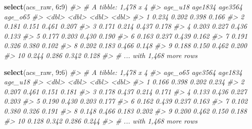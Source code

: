 \documentclass[
]{book}
\newenvironment{Shaded}{\begin{snugshade}}{\end{snugshade}}
\newcommand{\CommentTok}[1]{\textcolor[rgb]{0.56,0.35,0.01}{\textit{#1}}}
\newcommand{\DecValTok}[1]{\textcolor[rgb]{0.00,0.00,0.81}{#1}}
\newcommand{\KeywordTok}[1]{\textcolor[rgb]{0.13,0.29,0.53}{\textbf{#1}}}
\newcommand{\NormalTok}[1]{#1}
\newcommand{\OperatorTok}[1]{\textcolor[rgb]{0.81,0.36,0.00}{\textbf{#1}}}
\begin{document}
\begin{Shaded}
\begin{Highlighting}[]
\KeywordTok{select}\NormalTok{(acs\_raw, }\DecValTok{6}\OperatorTok{:}\DecValTok{9}\NormalTok{)}
\CommentTok{\#\textgreater{} \# A tibble: 1,478 x 4}
\CommentTok{\#\textgreater{}    age\_u18 age1834 age3564 age\_o65}
\CommentTok{\#\textgreater{}      \textless{}dbl\textgreater{}   \textless{}dbl\textgreater{}   \textless{}dbl\textgreater{}   \textless{}dbl\textgreater{}}
\CommentTok{\#\textgreater{}  1   0.234   0.202   0.398   0.166}
\CommentTok{\#\textgreater{}  2   0.181   0.151   0.461   0.207}
\CommentTok{\#\textgreater{}  3   0.171   0.214   0.437   0.178}
\CommentTok{\#\textgreater{}  4   0.203   0.227   0.436   0.133}
\CommentTok{\#\textgreater{}  5   0.177   0.203   0.430   0.190}
\CommentTok{\#\textgreater{}  6   0.163   0.237   0.439   0.162}
\CommentTok{\#\textgreater{}  7   0.191   0.326   0.380   0.102}
\CommentTok{\#\textgreater{}  8   0.202   0.183   0.466   0.148}
\CommentTok{\#\textgreater{}  9   0.188   0.150   0.462   0.200}
\CommentTok{\#\textgreater{} 10   0.244   0.286   0.342   0.128}
\CommentTok{\#\textgreater{} \# ... with 1,468 more rows}
\end{Highlighting}
\end{Shaded}

\begin{Shaded}
\begin{Highlighting}[]
\KeywordTok{select}\NormalTok{(acs\_raw, }\DecValTok{9}\OperatorTok{:}\DecValTok{6}\NormalTok{)}
\CommentTok{\#\textgreater{} \# A tibble: 1,478 x 4}
\CommentTok{\#\textgreater{}    age\_o65 age3564 age1834 age\_u18}
\CommentTok{\#\textgreater{}      \textless{}dbl\textgreater{}   \textless{}dbl\textgreater{}   \textless{}dbl\textgreater{}   \textless{}dbl\textgreater{}}
\CommentTok{\#\textgreater{}  1   0.166   0.398   0.202   0.234}
\CommentTok{\#\textgreater{}  2   0.207   0.461   0.151   0.181}
\CommentTok{\#\textgreater{}  3   0.178   0.437   0.214   0.171}
\CommentTok{\#\textgreater{}  4   0.133   0.436   0.227   0.203}
\CommentTok{\#\textgreater{}  5   0.190   0.430   0.203   0.177}
\CommentTok{\#\textgreater{}  6   0.162   0.439   0.237   0.163}
\CommentTok{\#\textgreater{}  7   0.102   0.380   0.326   0.191}
\CommentTok{\#\textgreater{}  8   0.148   0.466   0.183   0.202}
\CommentTok{\#\textgreater{}  9   0.200   0.462   0.150   0.188}
\CommentTok{\#\textgreater{} 10   0.128   0.342   0.286   0.244}
\CommentTok{\#\textgreater{} \# ... with 1,468 more rows}
\end{Highlighting}
\end{Shaded}
\end{document}
